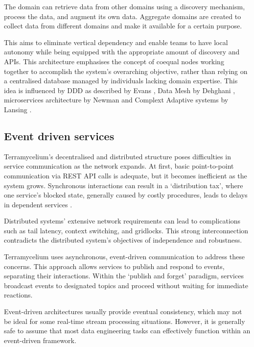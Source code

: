 \documentclass[preprint,12pt]{elsarticle}
\begin{document}
The domain can retrieve data from other domains using a discovery mechanism, process the data, and augment its own data. Aggregate domains are created to collect data from different domains and make it available for a certain purpose. 

This aims to eliminate vertical dependency and enable teams to have local autonomy while being equipped with the appropriate amount of discovery and APIs. This architecture emphasises the concept of coequal nodes working together to accomplish the system's overarching objective, rather than relying on a centralised database managed by individuals lacking domain expertise. This idea is influenced by DDD as described by Evans \cite{evans2004domain}, Data Mesh by Dehghani \cite{DataMesh}, microservices architecture by Newman \cite{newman2021building} and Complext Adaptive systems by Lansing \cite{lansing2003complex}. 

\subsection{Event driven services}

Terramycelium's decentralised and distributed structure poses difficulties in service communication as the network expands. At first, basic point-to-point communication via REST API calls is adequate, but it becomes inefficient as the system grows. Synchronous interactions can result in a `distribution tax', where one service's blocked state, generally caused by costly procedures, leads to delays in dependent services \cite{montesi2016circuit}.

Distributed systems' extensive network requirements can lead to complications such as tail latency, context switching, and gridlocks. This strong interconnection contradicts the distributed system's objectives of independence and robustness.

Terramycelium uses asynchronous, event-driven communication to address these concerns. This approach allows services to publish and respond to events, separating their interactions. Within the `publish and forget' paradigm, services broadcast events to designated topics and proceed without waiting for immediate reactions.

Event-driven architectures usually provide eventual consistency, which may not be ideal for some real-time stream processing situations. However, it is generally safe to assume that most data engineering tasks can effectively function within an event-driven framework.
\end{document}
